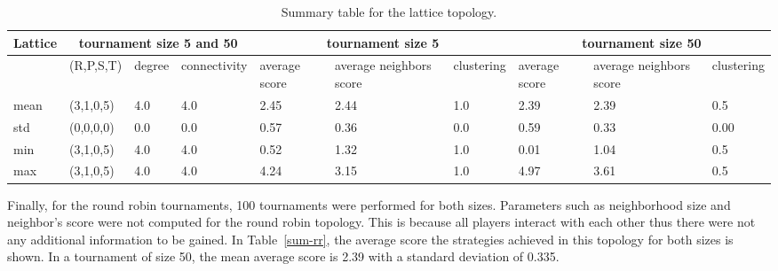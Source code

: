 \begin{table}[!hbtp]
	\centering
	\begin{adjustbox}{width=1\textwidth}
		\small
		\begin{tabular}{@{}|l|l|l|l|l|l|l|l|l|l|@{}}
			\toprule
			Lattice & \multicolumn{3}{c|}{tournament size 5 and 50} & \multicolumn{3}{c|}{tournament size 5} & \multicolumn{3}{c|}{tournament size 50}                            \\ \midrule
			     & (R,P,S,T) & degree & connectivity & average score & average neighbors score & clustering & average score & average neighbors score & clustering \\ \midrule
			mean & (3,1,0,5) & 4.0    & 4.0          & 2.45          & 2.44                    & 1.0        & 2.39          & 2.39                    & 0.5        \\ \midrule
			std  & (0,0,0,0) & 0.0    & 0.0          & 0.57          & 0.36                    & 0.0        & 0.59          & 0.33                    & 0.00       \\ \midrule
			min  & (3,1,0,5) & 4.0    & 4.0          & 0.52          & 1.32                    & 1.0        & 0.01          & 1.04                    & 0.5        \\ \midrule
			max  & (3,1,0,5) & 4.0    & 4.0          & 4.24          & 3.15                    & 1.0        & 4.97          & 3.61                    & 0.5        \\ \bottomrule
		\end{tabular}
	\end{adjustbox}
	\caption{Summary table for the lattice topology.}
	\label{sum-lattice}
\end{table}

Finally, for the round robin tournaments, 100 tournaments were performed for both
sizes. Parameters such as neighborhood size and neighbor's score
were not computed for the round robin topology. This is because all players
interact with each other thus there were not any additional information to be
gained. In Table~\ref{sum-rr}, the average score the strategies achieved
in this topology for both sizes is shown. In a tournament of size 50, the mean average
score is 2.39 with a standard deviation of 0.335.

